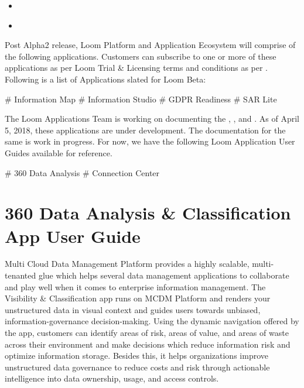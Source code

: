 \documentclass[letterpaper,10pt,english]{sphinxmanual}
\begin{document}
\begin{sphinxShadowBox}
\begin{itemize}
\begin{itemize}
\item {} 
\label{\detokenize{mcdmp_app_ug:id15}}{\hyperref[\detokenize{mcdmp_app_ug:configuring-on-cloud-content-sources}]{}}

\item {} 
\label{\detokenize{mcdmp_app_ug:id16}}{\hyperref[\detokenize{mcdmp_app_ug:configuring-on-premises-content-sources}]{}}

\end{itemize}

\end{itemize}
\end{sphinxShadowBox}

Post Alpha2 release, Loom Platform and Application Ecosystem will comprise of the following applications.  Customers can subscribe to one or more of these applications as per Loom Trial \& Licensing terms and conditions as per . Following is a list of Applications slated for Loom Beta:

\# Information Map
\# Information Studio
\# GDPR Readiness
\# SAR Lite

The Loom Applications Team is working on documenting the , ,  and .  As of April 5, 2018, these applications are under development. The documentation for the same is work in progress.  For now, we have the following Loom Application User Guides available for reference.

\# 360 Data Analysis
\# Connection Center


\chapter{360 Data Analysis \& Classification App User Guide}
\label{\detokenize{mcdmp_app_ug:mcdmp-vis-app-ug}}\label{\detokenize{mcdmp_app_ug:app-user-guides}}\label{\detokenize{mcdmp_app_ug:data-analysis-classification-app-user-guide}}\label{\detokenize{mcdmp_app_ug:loom-app-user-guides}}
Multi Cloud Data Management Platform provides a highly scalable, multi-tenanted glue which helps several data management applications to collaborate and play well when it comes to enterprise information management.  The Visibility \& Classification app runs on MCDM Platform and  renders your unstructured data in visual context and guides users towards unbiased, information-governance decision-making. Using the dynamic navigation offered by the app, customers can identify areas of risk, areas of value, and areas of waste across their environment and make decisions which reduce information risk and optimize information storage. Besides this, it helps organizations improve unstructured data governance to reduce costs and risk through actionable intelligence into data ownership, usage, and access controls.
\end{document}

